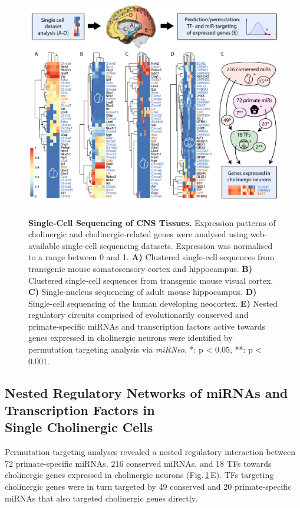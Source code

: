 \begin{figure}[ht]
\centering
\includegraphics[height=10cm]{figures/singlecell}
\caption[Single-Cell Sequencing of CNS Tissues.]{\textbf{Single-Cell Sequencing of CNS Tissues.} Expression patterns of cholinergic and cholinergic-related genes were analysed using web-available single-cell sequencing datasets. Expression was normalised to a range between 0 and 1. \textbf{A)} Clustered single-cell sequences from transgenic mouse somatosensory cortex and hippocampus.\cite{Zeisel2015} \textbf{B)} Clustered single-cell sequences from transgenic mouse visual cortex.\cite{Tasic2016} \textbf{C)} Single-nucleus sequencing of adult mouse hippocampus.\cite{Habib2016} \textbf{D)} Single-cell sequencing of the human developing neocortex.\cite{Darmanis2015} \textbf{E)} Nested regulatory circuits comprised of evolutionarily conserved and primate-specific miRNAs and transcription factors active towards genes expressed in cholinergic neurons were identified by permutation targeting analysis via \emph{miRNeo}. *: p < 0.05, **: p < 0.001.
\label{fig:singlecell}}
\end{figure}

\subsection{Nested Regulatory Networks of miRNAs and Transcription Factors in \\Single Cholinergic Cells}
Permutation targeting analyses revealed a nested regulatory interaction between 72 primate-specific miRNAs, 216 conserved miRNAs, and 18 TFs towards cholinergic genes expressed in cholinergic neurons (Fig.\,\ref{fig:singlecell}\,E). TFs targeting cholinergic genes were in turn targeted by 49 conserved and 20 primate-specific miRNAs that also targeted cholinergic genes directly.

